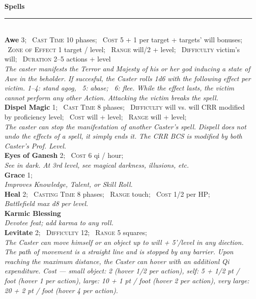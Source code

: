 \documentclass[11pt]{article}
\newcommand{\spell}[1]{{\sc\bfseries\large #1}}
\begin{document}
\clearpage
\noindent
{\sc\bfseries\Large Spells}
\vspace*{4pt}
\hrule
%
\mbox{ }
\\[12pt]
%
\spell{Awe} 3;
\ \textsc{Cast Time} 10 phases;
\ \textsc{Cost} 5 + 1 per target + targets' will bonuses;
\ \textsc{Zone of Effect} 1 target / level;
\ \textsc{Range} will/2 + level;
\ \textsc{Difficulty} victim's will;
\ \textsc{Duration} 2--5 actions + level
\\
\textsl{The caster manifests the Terror and Majesty of his or her god inducing
a state of Awe in the beholder.  If succesful, the Caster rolls 1d6
with the following effect per victim.  1--4: stand agog, \, 5: abase;
\, 6: flee.  While the effect lasts, the victim cannot perform any
other Action.  Attacking the victim breaks the spell.}
%
\\[4pt]
%
\spell{Dispel Magic} 1;
\ \textsc{Cast Time} 8 phases;
\ \textsc{Difficulty} will vs. will CRR modified by proficiency level;
\ \textsc{Cost} will + level;
\ \textsc{Range} will + level;
\\
\textsl{The caster can stop the manifestation of another Caster's
  spell.  Dispell does not undo the effects of a spell, it simply ends
  it.  The CRR BCS is modified by both Caster's Prof. Level.}
%
\\[4pt]
%
\spell{Eyes of Ganesh} 2;
\ \textsc{Cost} 6 qi / hour;
\\
\textsl{See in dark.  At 3rd level, see magical darkness, illusions, etc.}
%
\\[4pt]
%
\spell{Grace} 1;
\\
\textsl{Improves Knowledge, Talent, or Skill Roll.}
%
\\[4pt]
%
\spell{Heal} 2;
\ \textsc{Casting Time} 8 phases;
\ \textsc{Range} touch;
\ \textsc{Cost} 1/2 per HP;
\\
\textsl{Battlefield max d8 per level.}
%
\\[4pt]
%
\spell{Karmic Blessing}
%
\\
\textsl{Devotee feat;  add karma to any roll.}
%
\\[4pt]
\spell{Levitate} 2; \ \textsc{Difficulty} 12; \ \textsc{Range} 5
squares;
\\
\textsl{The Caster can move himself or an object up to will + 5'/level
  in any diection.  The path of movement is a straight line and is
  stopped by any barrier.  Upon reaching the maximum distance, the
  Caster can hover with an additionl Qi expenditure.  Cost ---
  small object: 2 (hover 1/2 per action), self: 5 + 1/2 pt / foot
  (hover 1 per action), large: 10 + 1 pt / foot (hover 2 per action),
  very large: 20 + 2 pt / foot (hover 4 per action).}
\end{document}
